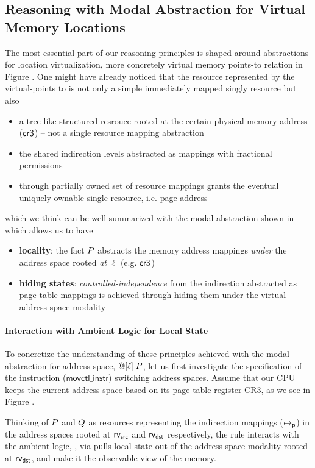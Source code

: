 \subsection{Reasoning with Modal Abstraction for Virtual Memory Locations}
\label{sec:modallocationvirtualization}

The most essential part of our reasoning principles is shaped around abstractions for location virtualization, more concretely virtual memory points-to relation in Figure . One might have already noticed that the resource represented by the virtual-points to is not only a simple immediately mapped singly resource but also
\begin{itemize}
\item a tree-like structured resrouce rooted at the certain physical memory address ($\mathsf{cr3}$) -- not a single resource mapping abstraction 
\item the shared indirection levels abstracted as mappings with fractional permissions
\item through partially owned set of resource mappings grants the eventual uniquely ownable single resource, i.e. page address 
\end{itemize}
which we think can be well-summarized with the modal abstraction shown in  which allows us to have
\begin{itemize}
  \item \textbf{locality}: the fact $P$ abstracts the memory address mappings \textit{under} the address space rooted \textit{at} $\ell$ (e.g. $\mathsf{cr3}$)
  \item \textbf{hiding states}: \textit{controlled-independence} from the indirection abstracted as page-table mappings is achieved through hiding them under the virtual address space modality
\end{itemize}

\paragraph{Interaction with Ambient Logic for Local State} To concretize the understanding of these principles achieved with the modal abstraction for address-space, $@[\ell]\; P$, let us first investigate the specification of the instruction ($\textsf{movctl\_instr}$) switching address spaces. Assume that our CPU keeps the current address space based on its page table register CR3, as we see in Figure .

Thinking of $P$ and $Q$ as resources representing the indirection mappings ($\mapsto_{\mathsf{p}}$) in the address spaces rooted at $\mathsf{rv}_{\textsf{src}}$ and $\mathsf{rv}_{\textsf{dst}}$ respectively, the rule interacts with the ambient logic, \SL, via pulls local state out of the address-space modality rooted at $\mathsf{rv}_{\textsf{dst}}$, and make it the observable view of the memory.

